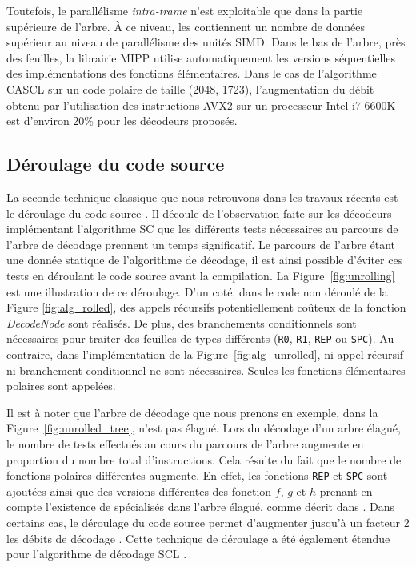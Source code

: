 Toutefois, le parallélisme \textit{intra-trame} n'est exploitable que dans la partie supérieure de l'arbre. \`A ce niveau, les \noeuds contiennent un nombre de données supérieur au niveau de parallélisme des unités SIMD. Dans le bas de l'arbre, près des feuilles, la librairie MIPP \cite{cassagne_efficient_2015} utilise automatiquement les versions séquentielles des implémentations des fonctions élémentaires. Dans le cas de l'algorithme CASCL sur un code polaire de taille (2048, 1723), l'augmentation du débit obtenu par l'utilisation des instructions AVX2 sur un processeur Intel i7 6600K est d'environ 20\% pour les décodeurs proposés.

\subsection{Déroulage du code source}
\label{subsec:unroll}
La seconde technique classique que nous retrouvons dans les travaux récents est le déroulage du code source \cite{sarkis_autogenerating_2014,giard_fast_2014,cassagne_efficient_2015,cassagne_energy_2016}. Il découle de l'observation faite sur les décodeurs implémentant l'algorithme SC que les différents tests nécessaires au parcours de l'arbre de décodage prennent un temps significatif. Le parcours de l'arbre étant une donnée statique de l'algorithme de décodage, il est ainsi possible d'éviter ces tests en \og déroulant \fg le code source avant la compilation. La Figure~\ref{fig:unrolling} est une illustration de ce déroulage. D'un coté, dans le code non déroulé de la Figure \ref{fig:alg_rolled}, des appels récursifs potentiellement coûteux de la fonction \textit{DecodeNode} sont réalisés. De plus, des branchements conditionnels sont nécessaires pour traiter des feuilles de types différents (\texttt{R0}, \texttt{R1}, \texttt{REP} ou \texttt{SPC}). Au contraire, dans l'implémentation de la Figure~\ref{fig:alg_unrolled}, ni appel récursif ni branchement conditionnel ne sont nécessaires. Seules les fonctions élémentaires polaires sont appelées.

Il est à noter que l'arbre de décodage que nous prenons en exemple, dans la Figure~\ref{fig:unrolled_tree}, n'est pas élagué. Lors du décodage d'un arbre élagué, le nombre de tests effectués au cours du parcours de l'arbre augmente en proportion du nombre total d'instructions. Cela résulte du fait que le nombre de fonctions polaires différentes augmente. En effet, les fonctions \texttt{REP} et \texttt{SPC} sont ajoutées ainsi que des versions différentes des fonction $f$, $g$ et $h$ prenant en compte l'existence de \noeuds spécialisés dans l'arbre élagué, comme décrit dans \cite{sarkis_fast_2014,cassagne_efficient_2015}. Dans certains cas, le déroulage du code source permet d'augmenter jusqu'à un facteur 2 les débits de décodage \cite{sarkis_autogenerating_2014}. Cette technique de déroulage a été également étendue pour l'algorithme de décodage SCL \cite{sarkis_fast_2016}.

